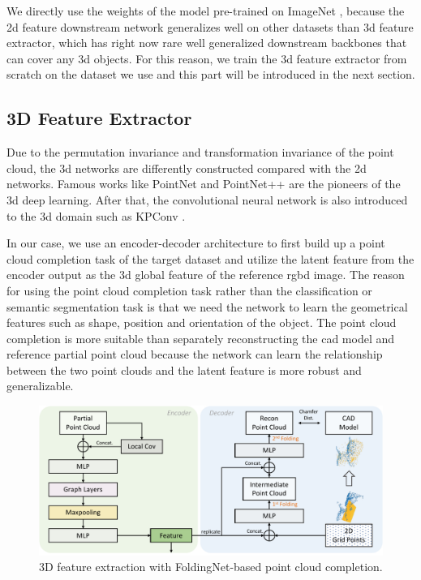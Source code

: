 \documentclass[12pt,DIV14,BCOR12mm,a4paper,footinclude=false,headinclude,parskip=half-,twoside,openright,cleardoublepage=empty,toc=index,bibliography=totoc,listof=totoc]{scrreprt}
\numberwithin{equation}{chapter}
\begin{document}
We directly use the weights of the model pre-trained on ImageNet \cite{5206848}, because the \gls{2d} feature downstream network generalizes well on other datasets than \gls{3d} feature extractor, which has right now rare well generalized downstream backbones that can cover any \gls{3d} objects. For this reason, we train the \gls{3d} feature extractor from scratch on the dataset we use and this part will be introduced in the next section.

\subsection{3D Feature Extractor}
Due to the permutation invariance and transformation invariance of the point cloud, the \gls{3d} networks are differently constructed compared with the \gls{2d} networks. Famous works like PointNet \cite{qi2017pointnet} and PointNet++ \cite{qi2017pointnet++} are the pioneers of the \gls{3d} deep learning. After that, the convolutional neural network is also introduced to the \gls{3d} domain such as KPConv \cite{thomas2019kpconv}. 

In our case, we use an encoder-decoder architecture to first build up a point cloud completion task of the target dataset and utilize the latent feature from the encoder output as the \gls{3d} global feature of the reference \gls{rgbd} image. The reason for using the point cloud completion task rather than the classification or semantic segmentation task is that we need the network to learn the geometrical features such as shape, position and orientation of the object. The point cloud completion is more suitable than separately reconstructing the \gls{cad} model and reference partial point cloud because the network can learn the relationship between the two point clouds and the latent feature is more robust and generalizable.
\begin{figure}[h]
	\centering
	\includegraphics[width=1.0\textwidth]{img/fold.pdf}
	\caption{3D feature extraction with FoldingNet-based point cloud completion.}
	\label{img:fold}
\end{figure}
\end{document}
